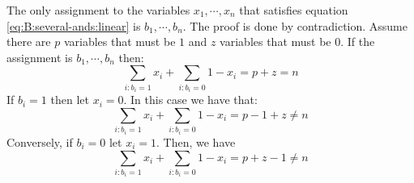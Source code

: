 \hfill

The only assignment to the variables $x_1,\cdots,x_n$ that satisfies equation
\ref{eq:B:several-ands:linear} is $b_1,\cdots,b_n$. The proof is done by contradiction.
Assume there are $p$ variables that must be $1$ and $z$ variables that must be $0$.
If the assignment is $b_1,\cdots,b_n$ then:
\[
\sum_{i : b_i=1} x_i + \sum_{i : b_i=0} 1 - x_i = p + z = n
\]
If $b_i=1$ then let $x_i=0$. In this case we have that:
\[
\sum_{i : b_i=1} x_i + \sum_{i : b_i=0} 1 - x_i = p - 1 + z \neq n
\]
Conversely, if $b_i=0$ let $x_i=1$. Then, we have
\[
\sum_{i : b_i=1} x_i + \sum_{i : b_i=0} 1 - x_i = p + z - 1 \neq n
\]
